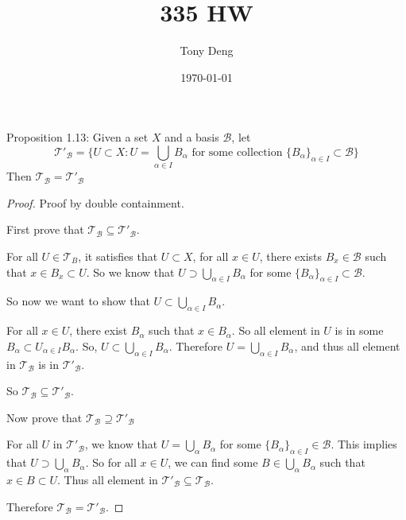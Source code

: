 \documentclass[12pt]{amsart}
\title{335 HW}
\author{Tony Deng}
\date{\today}
\newcommand{\B}{\mathcal{B}}
\newcommand{\T}{\mathcal{T}}
\begin{document}
\maketitle

Proposition 1.13: Given a set $X$ and a basis $\B$, let
\[\T'_\B = \{U \subset X : U = \bigcup_{\alpha \in I} B_\alpha \text{ for some collection } \{B_\alpha\}_{\alpha \in I} \subset \B \}\]
Then $\T_\B = \T'_\B$

\begin{proof}
Proof by double containment.

First prove that $\T_\B \subseteq \T'_\B$.

For all $U \in \T_B$, it satisfies that $U \subset X$, for all $x \in U$, there exists $B_x \in \B$ such that $x \in B_x \subset U$.
So we know that $U \supset \bigcup_{\alpha \in I} B_\alpha$ for some $\{B_\alpha\}_{\alpha \in I} \subset \B$.

So now we want to show that $U \subset \bigcup_{\alpha \in I} B_\alpha$.

For all $x \in U$, there exist $B_\alpha$ such that $x \in B_\alpha$.
So all element in $U$ is in some $B_\alpha \subset U_{\alpha \in I} B_\alpha$.
So, $U \subset \bigcup_{\alpha \in I} B_\alpha$.
Therefore $U = \bigcup_{\alpha \in I} B_\alpha$, and thus all element in $\T_\B$ is in $\T'_\B$.

So $\T_\B \subseteq \T'_\B$.

Now prove that $\T_\B \supseteq \T'_\B$

For all $U$ in $\T'_\B$, we know that $U = \bigcup_\alpha B_\alpha$ for some $\{B_\alpha\}_{\alpha \in I} \in \B$.
This implies that $U \supset \bigcup_\alpha B_\alpha$.
So for all $x \in U$, we can find some $B \in \bigcup_\alpha B_\alpha$ such that $x \in B \subset U$.
Thus all element in $\T'_\B \subseteq \T_\B$.

Therefore $\T_\B = \T'_\B.$
\end{proof}
\end{document}
